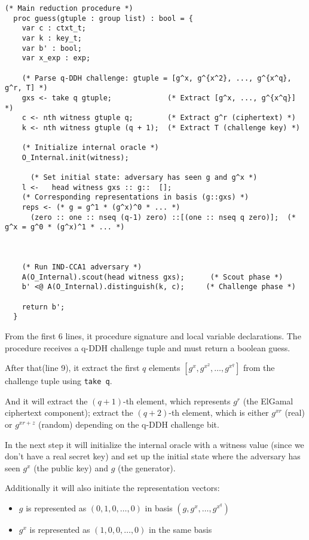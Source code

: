 \begin{lstlisting}[style=easycrypt, caption=Main Reduction Procedure, breaklines=true, breakatwhitespace=true, frame=single, keepspaces=true]
  (* Main reduction procedure *)
  proc guess(gtuple : group list) : bool = {
    var c : ctxt_t; 
    var k : key_t;
    var b' : bool;
    var x_exp : exp;

    (* Parse q-DDH challenge: gtuple = [g^x, g^{x^2}, ..., g^{x^q}, g^r, T] *)
    gxs <- take q gtuple;             (* Extract [g^x, ..., g^{x^q}] *)
    c <- nth witness gtuple q;        (* Extract g^r (ciphertext) *)  
    k <- nth witness gtuple (q + 1);  (* Extract T (challenge key) *)
    
    (* Initialize internal oracle *)
    O_Internal.init(witness);
    
      (* Set initial state: adversary has seen g and g^x *)
    l <-   head witness gxs :: g::  [];
    (* Corresponding representations in basis (g::gxs) *)
    reps <- (* g = g^1 * (g^x)^0 * ... *)
      (zero :: one :: nseq (q-1) zero) ::[(one :: nseq q zero)];  (* g^x = g^0 * (g^x)^1 * ... *)

   
    
    (* Run IND-CCA1 adversary *)
    A(O_Internal).scout(head witness gxs);      (* Scout phase *)
    b' <@ A(O_Internal).distinguish(k, c);     (* Challenge phase *)
    
    return b';
  }
\end{lstlisting}


From the first 6 lines, it procedure signature and local variable declarations. The procedure receives a q-DDH challenge tuple and must return a boolean guess.

After that(line 9), it extract the first $q$ elements $[g^x, g^{x^2}, \ldots, g^{x^q}]$ from the challenge tuple using \texttt{take q}.

And it will extract the $(q+1)$-th element, which represents $g^r$ (the ElGamal ciphertext component); extract the $(q+2)$-th element, which is either $g^{xr}$ (real) or $g^{xr+z}$ (random) depending on the q-DDH challenge bit.

In the next step it will initialize the internal oracle with a witness value (since we don't have a real secret key) and set up the initial state where the adversary has seen $g^x$ (the public key) and $g$ (the generator).

Additionally it will also initiate the representation vectors:
  \begin{itemize}
  \item $g$ is represented as $(0, 1, 0, \ldots, 0)$ in basis $(g, g^x, \ldots, g^{x^q})$
  \item $g^x$ is represented as $(1, 0, 0, \ldots, 0)$ in the same basis
  \end{itemize}

